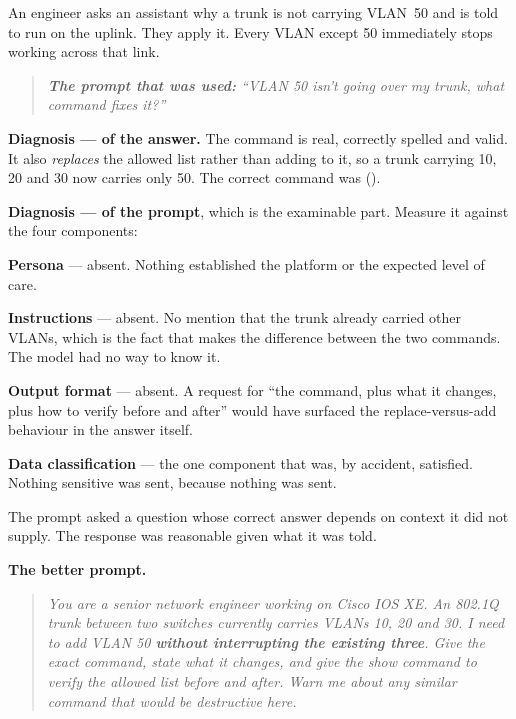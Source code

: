 \begin{breakfix}
An engineer asks an assistant why a trunk is not carrying VLAN~50 and is told to
run  on the uplink. They apply it. Every
VLAN except 50 immediately stops working across that link.

\begin{quote}
\RaggedRight\itshape \textbf{The prompt that was used:} ``VLAN 50 isn't going over
my trunk, what command fixes it?''
\end{quote}

\textbf{Diagnosis --- of the answer.} The command is real, correctly spelled and
valid. It also \emph{replaces} the allowed list rather than adding to it, so a
trunk carrying 10, 20 and 30 now carries only 50. The correct command was
 ().

\textbf{Diagnosis --- of the prompt}, which is the examinable part. Measure it
against the four components:

\begin{tight}
  \item \textbf{Persona} --- absent. Nothing established the platform or the
        expected level of care.
  \item \textbf{Instructions} --- absent. No mention that the trunk already
        carried other VLANs, which is the fact that makes the difference between
        the two commands. The model had no way to know it.
  \item \textbf{Output format} --- absent. A request for ``the command, plus what
        it changes, plus how to verify before and after'' would have surfaced the
        replace-versus-add behaviour in the answer itself.
  \item \textbf{Data classification} --- the one component that was, by accident,
        satisfied. Nothing sensitive was sent, because nothing was sent.
\end{tight}

The prompt asked a question whose correct answer depends on context it did not
supply. The response was reasonable given what it was told.

\textbf{The better prompt.}

\begin{quote}
\RaggedRight\itshape You are a senior network engineer working on Cisco IOS XE.
An 802.1Q trunk between two switches currently carries VLANs 10, 20 and 30. I
need to add VLAN 50 \textbf{without interrupting the existing three}. Give the
exact command, state what it changes, and give the show command to verify the
allowed list before and after. Warn me about any similar command that would be
destructive here.
\end{quote}


\end{breakfix}
